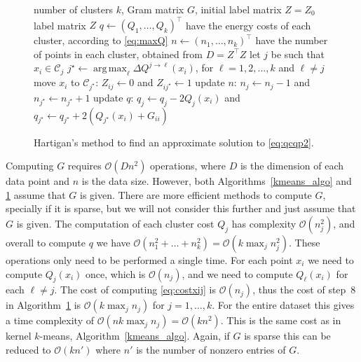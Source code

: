 \documentclass[aps,preprint,nofootinbib,floatfix]{revtex4-1}
\DeclareMathOperator*{\argmax}{arg\,max}
\newcommand\C{{\mathcal{C}}}
\newcommand\OO{{\mathcal{O}}}
\begin{document}
\begin{figure}
\begin{algorithm}[H]
\vspace{.5em}
\begin{algorithmic}[1]
    \INPUT number of clusters $k$, Gram matrix $G$, 
                initial label matrix $Z=Z_0$
    \OUTPUT label matrix $Z$
  \STATE $q \leftarrow (Q_1, \dotsc, Q_k)^\top$ 
            have the energy costs of each cluster, according to \eqref{eq:maxQ}
  \STATE $n \leftarrow (n_1,\dotsc,n_k)^\top$ have the number of points 
        in each cluster, obtained from $D=Z^\top Z$
  \REPEAT
        \STATE let $j$ be such that $x_i \in \C_j$
        \STATE $j^\star \leftarrow \argmax_{\ell} \Delta Q^{j\to \ell}(x_i)$, 
            for $\ell=1,2,\dots,k$ and $\ell \ne j$ \label{stepmove}
            \STATE move $x_i$ to $\C_{j^\star}$: $Z_{ij} \leftarrow 0$ and 
            $Z_{ij^\star} \leftarrow 1$
            \STATE update $n$: $n_j \leftarrow n_j - 1$ and
                    $n_{j^\star} \leftarrow n_{j^\star} + 1$
            \STATE update $q$: $q_j \leftarrow q_j - 2Q_j(x_i)$ and
    $q_{j^\star} \leftarrow q_{j^\star} + 2\left(Q_{j^\star}(x_i)+
    G_{ii}\right)$
        \ENDIF
    \ENDFOR
\end{algorithmic}
\caption{\label{algo}
Hartigan's method to find an approximate solution to \eqref{eq:qcqp2}.
\hspace{\fill}
}
\end{algorithm}
\end{figure}

Computing $G$ requires $\OO( D n^2)$ operations, where 
$D$ is the dimension of each data point and $n$ is the data size. However,
both Algorithms~\ref{kmeans_algo} and \ref{algo} 
assume that $G$ is given. There are more efficient
methods to compute $G$, specially if it is sparse, but we will not consider
this further and just assume that $G$ is given.
The computation of each cluster cost
$Q_j$ has complexity $\OO(n_j^2)$, and overall to compute $q$
we have $\OO(n_1^2+\dots + n_k^2) = \OO(k \max_j n_j^2)$. 
These operations only need to be performed a single time. For
each point $x_i$ we need to compute $Q_j(x_i)$ once, which is
$\OO(n_j)$, and we need to compute $Q_\ell(x_i)$ for each $\ell\ne j$. 
The cost of computing 
\eqref{eq:costxij} is $\OO(n_j)$, thus the cost of step~$8$ in
Algorithm~\ref{algo} is $\OO(k \max_j n_j)$ for $j=1,\dotsc,k$.
For the 
entire dataset this gives a time complexity
of $\OO(n k  \max_j n_j) =\OO(k n^2)$. This is the same cost as
in kernel $k$-means, Algorithm~\ref{kmeans_algo}. Again, if $G$ is sparse
this can be reduced to $\OO(k n')$ where $n'$ is the number of nonzero
entries of $G$.
\end{document}
